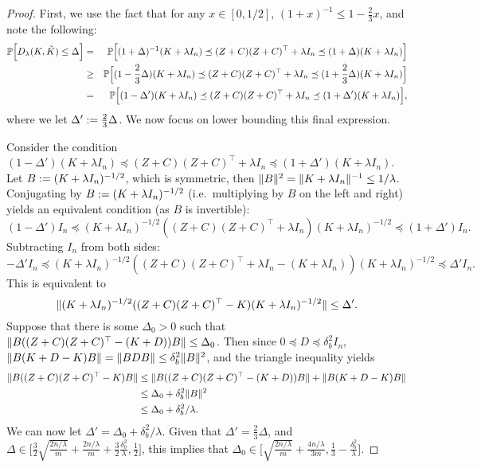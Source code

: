 \begin{proof}
First, we use the fact that for any $x\in[0,1/2]$, $(1+x)^{-1} \leq 1-\frac{2}{3}x$, and note the following:
\begin{eqnarray*}
\mathbb{P}\Big[D_{\lambda}(K,\tilde{K}) \leq \Delta\Big] &=& \mathbb{P}\Big[(1 + \Delta)^{-1}(K + \lambda I_n) \preceq (Z + C) (Z + C)^\top + \lambda I_n \preceq (1 + \Delta)(K + \lambda I_n)\Big] \\
&\geq& \mathbb{P}\Big[(1 - \frac{2}{3}\Delta)(K + \lambda I_n) \preceq (Z + C) (Z + C)^\top + \lambda I_n \preceq (1 + \frac{2}{3}\Delta)(K + \lambda I_n)\Big]\\
&=& \mathbb{P}\Big[(1 - \Delta')(K + \lambda I_n) \preceq (Z + C) (Z + C)^\top + \lambda I_n \preceq (1 + \Delta')(K + \lambda I_n)\Big],
\end{eqnarray*}
where we let $\Delta' := \frac{2}{3}\Delta$.  We now focus on lower bounding this final expression.

Consider the condition $(1 - \Delta')(K + \lambda I_n) \preceq (Z + C) (Z + C)^\top + \lambda I_n \preceq (1 +
\Delta')(K + \lambda I_n)$.
Let $B := (K + \lambda I_n)^{-1/2}$, which is symmetric, then $\|B\|^2 =
\|K + \lambda I_n\|^{-1} \leq 1/\lambda$.
Conjugating by $B := (K + \lambda I_n)^{-1/2}$ (i.e.\ multiplying by $B$ on the
left and right) yields an equivalent condition (as $B$ is
invertible):
\begin{equation*}
(1 - \Delta') I_n \preceq (K + \lambda I_n)^{-1/2} ((Z + C) (Z + C)^\top + \lambda I_n) (K + \lambda I_n)^{-1/2} \preceq (1 + \Delta') I_n.
\end{equation*}
Subtracting $I_n$ from both sides:
\begin{equation*}
-\Delta' I_n \preceq (K + \lambda I_n)^{-1/2} ((Z + C) (Z + C)^\top + \lambda I_n - (K + \lambda I_n)) (K + \lambda I_n)^{-1/2} \preceq \Delta' I_n.
\end{equation*}
This is equivalent to
\begin{equation*}
\|(K + \lambda I_n)^{-1/2} ((Z + C) (Z + C)^\top - K) (K + \lambda I_n)^{-1/2}\| \leq \Delta'.
\end{equation*}
Suppose that there is some $\Delta_0 > 0$ such that $\|B((Z + C)(Z + C)^\top - (K + D))B\| \leq \Delta_0$.
Then since $0 \preceq D \preceq \delta^2_b I_n$, $\|B(K + D - K) B\| = \|B D B\| \leq \delta^2_b
\|B\|^2$, and the triangle inequality yields
\begin{align*}
\|B((Z + C)(Z + C)^\top - K)B\|
&\leq \|B((Z + C)(Z + C)^\top - (K + D))B\| + \|B (K + D - K)B\| \\
&\leq \Delta_0 + \delta^2_b \|B\|^2 \\
&\leq \Delta_0 + \delta^2_b/\lambda.
\end{align*}
We can now let $\Delta' = \Delta_0 + \delta^2_b/\lambda$.  Given that $\Delta' = \frac{2}{3}\Delta$, and $\Delta \in \Big[\frac{3}{2}\sqrt{\frac{2n/\lambda}{m}} + \frac{2n/\lambda}{m} + \frac{3}{2}\frac{\delta^2_b}{\lambda}, \frac{1}{2} \Big]$, this implies that $\Delta_0 \in \Big[\sqrt{\frac{2n/\lambda}{m}} + \frac{4n/\lambda}{3m}, \frac{1}{3}-\frac{\delta^2_b}{\lambda}\Big]$.


\end{proof}
